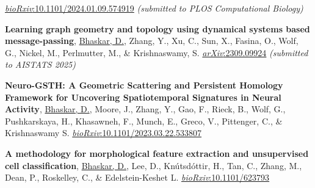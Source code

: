 \documentclass[margin,line]{res}
\begin{document}
\begin{resume}
{\begin{etaremune}[start=8]
\href{https://doi.org/10.1101/2024.01.09.574919}{\textit{bioRxiv}:10.1101/2024.01.09.574919}
\textit{(submitted to PLOS Computational Biology)}
\vspace*{.1cm}
\item{\bf Learning graph geometry and topology using dynamical systems based message-passing},
\underline{Bhaskar, D.}, Zhang, Y., Xu, C., Sun, X., Fasina, O., Wolf, G., Nickel, M., Perlmutter, M., \& Krishnaswamy, S. 
\href{https://arxiv.org/abs/2309.09924}{\textit{arXiv}:2309.09924}
\textit{(submitted to AISTATS 2025)}
\vspace*{.1cm}
\item{\bf Neuro-GSTH: A Geometric Scattering and Persistent Homology Framework for Uncovering Spatiotemporal Signatures in Neural Activity},
\underline{Bhaskar, D.}, Moore, J., Zhang, Y., Gao, F., Rieck, B., Wolf, G., Pushkarskaya, H., Khasawneh, F., Munch, E., Greco, V., Pittenger, C., \& Krishnaswamy S.
\href{https://www.biorxiv.org/content/10.1101/2023.03.22.533807v2}{\textit{bioRxiv}:10.1101/2023.03.22.533807}
\vspace*{.1cm}
\item{\bf A methodology for morphological feature extraction and unsupervised cell classification},
\underline{Bhaskar, D.}, Lee, D., Kn\'{u}tsd\'{o}ttir, H., Tan, C., Zhang, M., Dean, P., Roskelley, C., \& Edelstein-Keshet L.
\href{https://www.biorxiv.org/content/10.1101/623793v1.abstract}{\textit{bioRxiv}:10.1101/623793}
\end{etaremune}
}


\end{resume}
\end{document}
